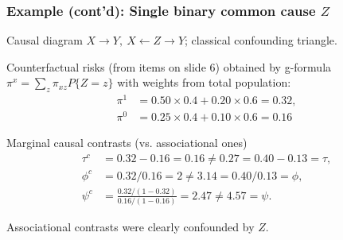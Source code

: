 \documentclass[12pt,dvipsnames,t,aspectratio=169, handout%
]{beamer}
\begin{document}
\begin{frame}
\frametitle{\large Example (cont'd): Single binary common cause $Z$}

\bi
\item Causal diagram $X \to Y, \ X \leftarrow Z \to Y$;  classical confounding triangle.
\medskip
\item Counterfactual risks (from items on slide 6) obtained by g-formula
$ \pi^x = \sum_z \pi_{xz} P\{ Z=z\} $ with weights from total population: 
\begin{align*}
  \pi^1 & = 0.50 \times 0.4 + 0.20 \times 0.6 = 0.32, \\
	\pi^0 & = 0.25 \times 0.4 + 0.10 \times 0.6 = 0.16
\end{align*}
\item
Marginal causal contrasts (vs. associational ones)
\begin{align*}
   \tau^c & = 0.32 - 0.16 = 0.16 \neq 0.27 = 0.40 - 0.13 =  \tau, \\
	 \phi^c & = 0.32/0.16 = 2 \neq 3.14 = 0.40/0.13 =  \phi, \\
	 \psi^c & = \frac{0.32/(1-0.32)}{0.16/(1-0.16)} = 2.47 \neq 4.57 = \psi.
\end{align*}
\item
Associational contrasts were clearly confounded by $Z$.
\ei 

\end{frame}

\end{document}
